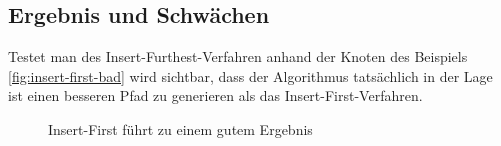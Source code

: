 \subsection{Ergebnis und Schwächen}
Testet man des Insert-Furthest-Verfahren anhand der Knoten des Beispiels \vref{fig:insert-first-bad} wird sichtbar, dass der Algorithmus tatsächlich in der Lage ist einen besseren Pfad zu generieren als das Insert-First-Verfahren.

\begin{figure}[H]
    \begin{center}
        \hfil
        \caption{Insert-First führt zu einem gutem Ergebnis}
        \label{fig:insert-furthest-good}
    \end{center}
\end{figure}

